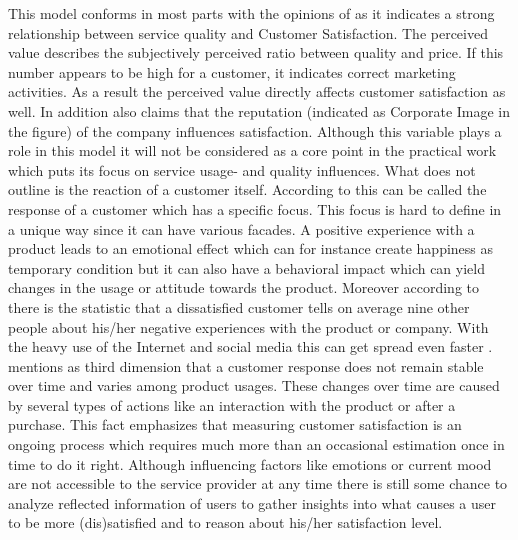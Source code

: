 This model conforms in most parts with the opinions of \cite{neckel2015} as it indicates a strong relationship between service quality and Customer Satisfaction. The perceived value describes the subjectively perceived ratio between quality and price. If this number appears to be high for a customer, it indicates correct marketing activities. As a result the perceived value directly affects customer satisfaction as well. In addition \cite{hussain2015service} also claims that the reputation (indicated as Corporate Image in the figure) of the company influences satisfaction. Although this variable plays a role in this model it will not be considered as a core point in the practical work which puts its focus on service usage- and quality influences. What \cite{neckel2015} does not outline is the reaction of a customer itself. According to \cite{jahanshani2014study} this can be called the response of a customer which has a specific focus. This focus is hard to define in a unique way since it can have various facades. A positive experience with a product leads to an emotional effect which can for instance create happiness as temporary condition but it can also have a behavioral impact which can yield changes in the usage or attitude towards the product. Moreover according to \cite{hussain2015service} there is the statistic that a dissatisfied customer tells on average nine other people about his/her negative experiences with the product or company. With the heavy use of the Internet and social media this can get spread even faster \cite{neckel2015}. \cite{jahanshani2014study} mentions as third dimension that a customer response does not remain stable over time and varies among product usages. These changes over time are caused by several types of actions like an interaction with the product or after a purchase. This fact emphasizes that measuring customer satisfaction is an ongoing process which requires much more than an occasional estimation once in time to do it right. Although influencing factors like emotions or current mood are not accessible to the service provider at any time there is still some chance to analyze reflected information of users to gather insights into what causes a user to be more (dis)satisfied and to reason about his/her satisfaction level.

